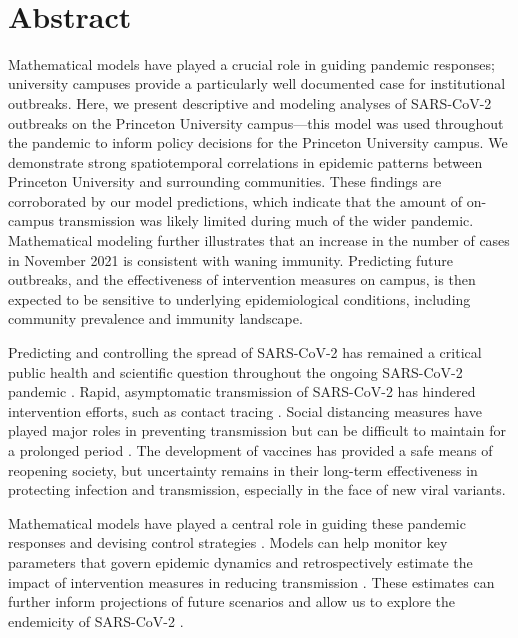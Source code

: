 \documentclass[12pt]{article}
\date{\today}
\begin{document}
\begin{flushleft}{
	\Large
	\textbf{}
}
\newline
\\ 
\end{flushleft}

\section*{Abstract}

Mathematical models have played a crucial role in guiding pandemic responses; university campuses provide a particularly well documented case for institutional outbreaks.
Here, we present descriptive and modeling analyses of SARS-CoV-2 outbreaks on the Princeton University campus---this model was used throughout the pandemic to inform policy decisions for the Princeton University campus.
We demonstrate strong spatiotemporal correlations in epidemic patterns between Princeton University and surrounding communities.
These findings are corroborated by our model predictions, which indicate that the amount of on-campus transmission was likely limited during much of the wider pandemic.
Mathematical modeling further illustrates that an increase in the number of cases in November 2021 is consistent with waning immunity.
Predicting future outbreaks, and the effectiveness of intervention measures on campus, is then expected to be sensitive to underlying epidemiological conditions, including community prevalence and immunity landscape. 

\pagebreak

Predicting and controlling the spread of SARS-CoV-2 has remained a critical public health and scientific question throughout the ongoing SARS-CoV-2 pandemic \citep{baker2021limits}.
Rapid, asymptomatic transmission of SARS-CoV-2 has hindered intervention efforts, such as contact tracing \citep{hellewell2020feasibility}.
Social distancing measures have played major roles in preventing transmission but can be difficult to maintain for a prolonged period \citep{galanti2021social}.
The development of vaccines has provided a safe means of reopening society, but uncertainty remains in their long-term effectiveness in protecting infection and transmission, especially in the face of new viral variants.

Mathematical models have played a central role in guiding these pandemic responses and devising control strategies \citep{metcalf2020mathematical}.
Models can help monitor key parameters that govern epidemic dynamics \citep{kraemer2021monitoring} and retrospectively estimate the impact of intervention measures in reducing transmission \citep{flaxman2020estimating}.
These estimates can further inform projections of future scenarios and allow us to explore the endemicity of SARS-CoV-2 \citep{kissler2020projecting,saad2020immune,lavine2021immunological,saad2021epidemiological}.
\end{document}
